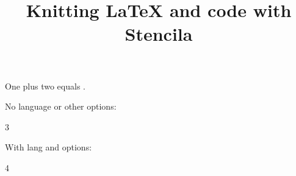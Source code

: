 \documentclass{article}
\begin{document}
\title{Knitting LaTeX and code with Stencila}

One plus two equals .

No language or other options:

\begin{chunk}
3
\end{chunk}

With lang and options:

\begin{chunk}
4
\end{chunk}
\end{document}
